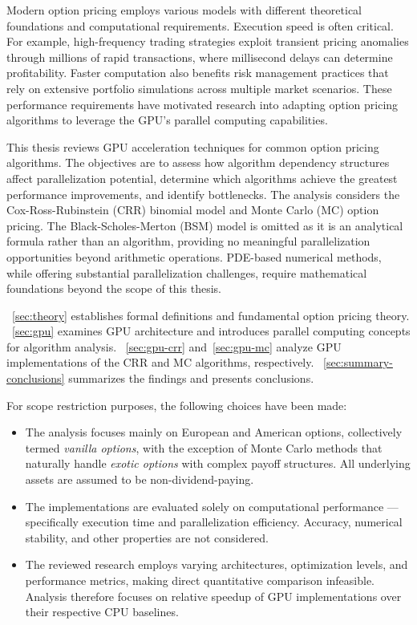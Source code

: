 \documentclass[english,12pt,a4paper,pdftex,sci,utf8]{aaltothesis}
\begin{document}
Modern option pricing employs various models with different theoretical foundations and computational requirements. Execution speed is often critical. For example, high-frequency trading strategies exploit transient pricing anomalies through millions of rapid transactions, where millisecond delays can determine profitability. Faster computation also benefits risk management practices that rely on extensive portfolio simulations across multiple market scenarios. These performance requirements have motivated research into adapting option pricing algorithms to leverage the GPU's parallel computing capabilities.

This thesis reviews GPU acceleration techniques for common option pricing algorithms. The objectives are to assess how algorithm dependency structures affect parallelization potential, determine which algorithms achieve the greatest performance improvements, and identify bottlenecks. The analysis considers the Cox-Ross-Rubinstein (CRR) binomial model and Monte Carlo (MC) option pricing. The Black-Scholes-Merton (BSM) model is omitted as it is an analytical formula rather than an algorithm, providing no meaningful parallelization opportunities beyond arithmetic operations. PDE-based numerical methods, while offering substantial parallelization challenges, require mathematical foundations beyond the scope of this thesis.

~\cref{sec:theory} establishes formal definitions and fundamental option pricing theory. ~\cref{sec:gpu} examines GPU architecture and introduces parallel computing concepts for algorithm analysis. ~\cref{sec:gpu-crr} and~\cref{sec:gpu-mc} analyze GPU implementations of the CRR and MC algorithms, respectively. ~\cref{sec:summary-conclusions} summarizes the findings and presents conclusions.

For scope restriction purposes, the following choices have been made:
\begin{itemize}
\item The analysis focuses mainly on European and American options, collectively termed \emph{vanilla options}, with the exception of Monte Carlo methods that naturally handle \emph{exotic options} with complex payoff structures. All underlying assets are assumed to be non-dividend-paying.
    
\item The implementations are evaluated solely on computational performance --- specifically execution time and parallelization efficiency. Accuracy, numerical stability, and other properties are not considered.

\item The reviewed research employs varying architectures, optimization levels, and performance metrics, making direct quantitative comparison infeasible. Analysis therefore focuses on relative speedup of GPU implementations over their respective CPU baselines.
\end{itemize}
\end{document}

